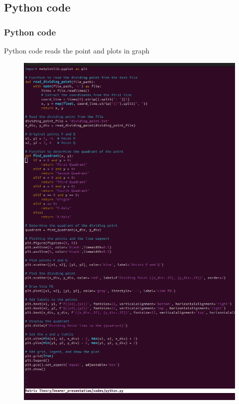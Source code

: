 \documentclass{beamer}
\theoremstyle{remark}
\numberwithin{equation}{section}
\begin{document}
\subsection{Python code}
\begin{frame}[fragile]
\frametitle{Python code}
Python code reads the point and plots in graph
                 	\begin{figure}[H]
	\centering
				\begin{minipage}{0.5\textwidth}
	\includegraphics[width=0.7\linewidth]{figs/Py-code.png}
			\end{minipage}
			\end{figure}


\end{frame}
\end{document}
